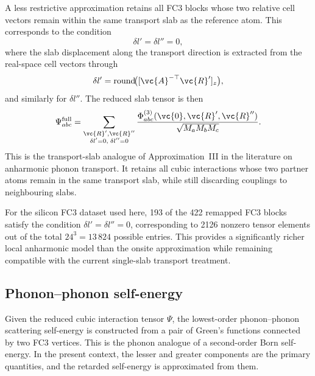 A less restrictive approximation retains all FC3 blocks whose two
relative cell vectors remain within the same transport slab as the
reference atom.  This corresponds to the condition
\begin{equation}
  \delta l' = \delta l'' = 0,
\end{equation}
where the slab displacement along the transport direction is extracted
from the real-space cell vectors through
\begin{equation}
  \delta l'
  = \mathrm{round}\!\bigl([\vc{A}^{-\top}\vc{R}']_z\bigr),
\end{equation}
and similarly for $\delta l''$.  The reduced slab tensor is then
\begin{equation}\label{eq:fc3_full}
  \Psi_{abc}^{\mathrm{full}}
  =
  \sum_{\substack{\vc{R}',\vc{R}'' \\
                  \delta l' = 0,\;\delta l'' = 0}}
  \frac{\Phi^{(3)}_{abc}(\vc{0},\vc{R}',\vc{R}'')}
       {\sqrt{M_a M_b M_c}}.
\end{equation}
This is the transport-slab analogue of Approximation~III in the
literature on anharmonic phonon transport.  It retains all cubic
interactions whose two partner atoms remain in the same transport slab,
while still discarding couplings to neighbouring slabs.

For the silicon FC3 dataset used here, 193 of the 422 remapped FC3
blocks satisfy the condition $\delta l'=\delta l''=0$, corresponding to
2126 nonzero tensor elements out of the total
$24^3 = 13\,824$ possible entries.  This provides a significantly richer
local anharmonic model than the onsite approximation while remaining
compatible with the current single-slab transport treatment.

\subsection{Phonon--phonon self-energy}
\label{sec:self_energy}

Given the reduced cubic interaction tensor $\Psi$, the lowest-order
phonon--phonon scattering self-energy is constructed from a pair of
Green's functions connected by two FC3 vertices.  This is the phonon
analogue of a second-order Born self-energy.  In the present context,
the lesser and greater components are the primary quantities, and the
retarded self-energy is approximated from them.

